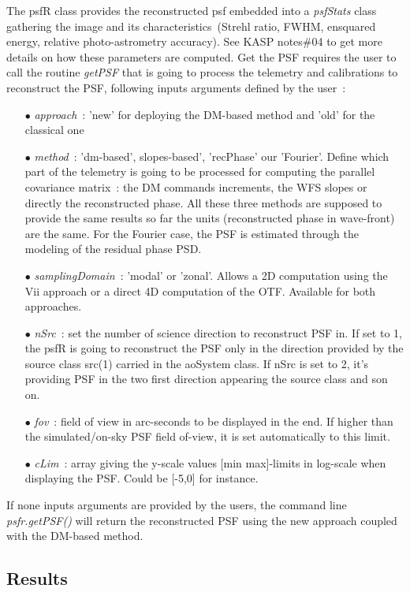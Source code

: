 \documentclass[12pt]{article}
\begin{document}
The psfR class provides the reconstructed psf embedded into a \emph{psfStats} class gathering the image and its characteristics~(Strehl ratio, FWHM, ensquared energy, relative photo-astrometry accuracy). See KASP notes\#04 to get more details on how these parameters are computed. Get the PSF requires the user to call the routine \emph{getPSF} that is going to process the telemetry and calibrations to reconstruct the PSF, following inputs arguments defined by the user~:
\begin{itemize}
	\item[$\bullet$] \emph{approach}~: 'new' for deploying the DM-based method and 'old' for the classical one
	\item[$\bullet$] \emph{method}~: 'dm-based', slopes-based', 'recPhase' our 'Fourier'. Define which part of the telemetry is going to be processed for computing the parallel covariance matrix~: the DM commands increments, the WFS slopes or directly the reconstructed phase. All these three methods are supposed to provide the same results so far the units (reconstructed phase in wave-front) are the same. For the Fourier case, the PSF is estimated through the modeling of the residual phase PSD.
	\item[$\bullet$] \emph{samplingDomain}~: 'modal' or 'zonal'. Allows a 2D computation using the Vii approach or a direct 4D computation of the OTF. Available for both approaches.
	\item[$\bullet$] \emph{nSrc}~: set the number of science direction to reconstruct PSF in. If set to 1, the psfR is going to reconstruct the PSF only in the direction provided by the source class src(1) carried in the aoSystem class. If nSrc is set to 2, it's providing PSF in the two first direction appearing the source class and son on.
	\item[$\bullet$] \emph{fov}~: field of view in arc-seconds to be displayed in the end. If higher than the simulated/on-sky PSF field of-view, it is set automatically to this limit.
	\item[$\bullet$] \emph{cLim}~: array giving the y-scale values [min max]-limits in log-scale when displaying the PSF. Could be [-5,0] for instance.	
\end{itemize}
If none inputs arguments are provided by the users, the command line \emph{psfr.getPSF()} will return the reconstructed PSF using the new approach coupled with the DM-based method.

\subsection{Results}
\end{document}
